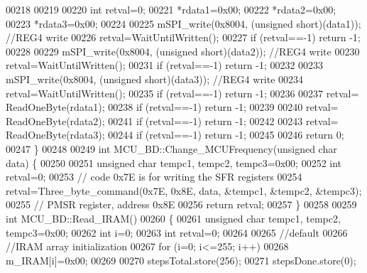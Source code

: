 \begin{DoxyCode}
00218 
00219 
00220         \textcolor{keywordtype}{int} retval=0;
00221         *rdata1=0x00;
00222         *rdata2=0x00;
00223         *rdata3=0x00;
00224 
00225         mSPI\_write(0x8004, (\textcolor{keywordtype}{unsigned} \textcolor{keywordtype}{short})(data1)); \textcolor{comment}{//REG4 write}
00226         retval=WaitUntilWritten();
00227         \textcolor{keywordflow}{if} (retval==-1) \textcolor{keywordflow}{return} -1;
00228 
00229         mSPI\_write(0x8004, (\textcolor{keywordtype}{unsigned} \textcolor{keywordtype}{short})(data2)); \textcolor{comment}{//REG4 write}
00230         retval=WaitUntilWritten();
00231         \textcolor{keywordflow}{if} (retval==-1) \textcolor{keywordflow}{return} -1;
00232 
00233         mSPI\_write(0x8004, (\textcolor{keywordtype}{unsigned} \textcolor{keywordtype}{short})(data3)); \textcolor{comment}{//REG4 write}
00234         retval=WaitUntilWritten();
00235         \textcolor{keywordflow}{if} (retval==-1) \textcolor{keywordflow}{return} -1;
00236 
00237         retval= ReadOneByte(rdata1);
00238         \textcolor{keywordflow}{if} (retval==-1) \textcolor{keywordflow}{return} -1;
00239 
00240         retval= ReadOneByte(rdata2);
00241         \textcolor{keywordflow}{if} (retval==-1) \textcolor{keywordflow}{return} -1;
00242 
00243         retval= ReadOneByte(rdata3);
00244         \textcolor{keywordflow}{if} (retval==-1) \textcolor{keywordflow}{return} -1;
00245 
00246         \textcolor{keywordflow}{return} 0;
00247 \}
00248 
00249 \textcolor{keywordtype}{int} MCU\_BD::Change\_MCUFrequency(\textcolor{keywordtype}{unsigned} \textcolor{keywordtype}{char} data) \{
00250 
00251     \textcolor{keywordtype}{unsigned} \textcolor{keywordtype}{char} tempc1, tempc2, tempc3=0x00;
00252     \textcolor{keywordtype}{int} retval=0;
00253     \textcolor{comment}{// code 0x7E is for writing the SFR registers}
00254     retval=Three\_byte\_command(0x7E, 0x8E, data, &tempc1, &tempc2, &tempc3);
00255     \textcolor{comment}{// PMSR register, address 0x8E}
00256     \textcolor{keywordflow}{return} retval;
00257 \}
00258 
00259 \textcolor{keywordtype}{int} MCU\_BD::Read\_IRAM()
00260 \{
00261     \textcolor{keywordtype}{unsigned} \textcolor{keywordtype}{char} tempc1, tempc2, tempc3=0x00;
00262     \textcolor{keywordtype}{int} i=0;
00263     \textcolor{keywordtype}{int} retval=0;
00264 
00265     \textcolor{comment}{//default}
00266     \textcolor{comment}{//IRAM array initialization}
00267     \textcolor{keywordflow}{for} (i=0; i<=255; i++)
00268         m\_IRAM[i]=0x00;
00269 
00270     stepsTotal.store(256);
00271     stepsDone.store(0);

\end{DoxyCode}
